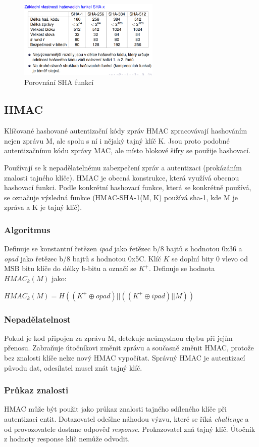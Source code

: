 \documentclass{szzclass}
\begin{document}
\begin{figure}[h!]
    \centering
    \includegraphics[width=0.6\textwidth]{topics/bi-spol-06/image/shaCompare.png}
    \caption{Porovnání SHA funkcí}
\end{figure}

\subsection{HMAC}
Klíčované hashované autentizační kódy zpráv HMAC zpracovávají hashováním nejen zprávu M, ale spolu s ní i nějaký tajný klíč K.
Jsou proto podobné autentizačnímu kódu zprávy MAC, ale místo blokové šifry se použije hashovací.

Používají se k nepadělatelnému zabezpečení zpráv a autentizaci (prokázáním znalosti tajného klíče). HMAC je obecná konstrukce, která využívá obecnou hashovací funkci.
Podle konkrétní hashovací funkce, která se konkrétně používá, se označuje výsledná funkce (HMAC-SHA-1(M, K) používá sha-1, kde M je zpráva a K je tajný klíč).
\subsubsection{Algoritmus}
Definuje se konstantní řetězen \textit{ipad} jako řetězec b/8 bajtů s hodnotou 0x36 a \textit{opad} jako řetězec b/8 bajtů s hodnotou 0x5C.
Klíč $K$ se doplní bity 0 vlevo od MSB bitu klíče do délky b-bitu a označí se $K^+$. Definuje se hodnota $HMAC_k(M)$ jako:
\begin{center}
$HMAC_k(M) = H((K^+ \oplus opad)||((K^+ \oplus ipad)||M))$
\end{center}
\subsubsection{Nepadělatelnost}
Pokud je kod připojen za zprávu M, detekuje neúmyslnou chybu při jejím přenosu. Zabraňuje útočníkovi změnit zprávu a současně změnit HMAC, protože
bez znalosti klíče nelze nový HMAC vypočítat. Správný HMAC je autentizací původu dat, odesílatel musel znát tajný klíč.
\subsubsection{Průkaz znalosti}
HMAC může být použit jako průkaz znalosti tajného sdíleného klíče při autentizaci entit. Dotazovatel odešlne náhodou výzvu, které se říká \textit{challenge}
a od provozovatele dostane odpověď \textit{response}. Prokazovatel zná tajný klíč. Útočník z hodnoty response klíč nemůže odvodit.
\end{document}
